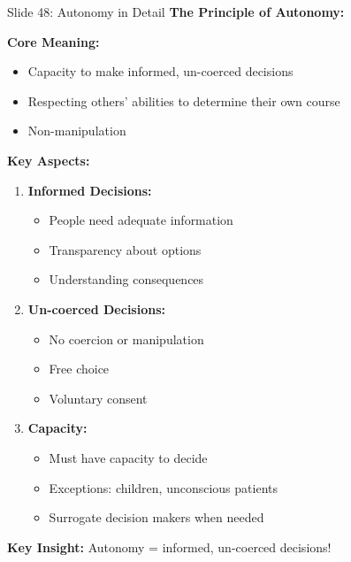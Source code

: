 \documentclass[8pt]{beamer}
\begin{document}
	\begin{frame}{Slide 48: Autonomy in Detail}
		\fontsize{6.5}{7.5}\selectfont
		\textbf{The Principle of Autonomy:}
		
		\vspace{0.1cm}
		\textbf{Core Meaning:}
		\begin{itemize}
			\item Capacity to make informed, un-coerced decisions
			\item Respecting others' abilities to determine their own course
			\item Non-manipulation
		\end{itemize}
		
		\vspace{0.1cm}
		\textbf{Key Aspects:}
		\begin{enumerate}
			\item \textbf{Informed Decisions:}
			\begin{itemize}
				\item People need adequate information
				\item Transparency about options
				\item Understanding consequences
			\end{itemize}
			\item \textbf{Un-coerced Decisions:}
			\begin{itemize}
				\item No coercion or manipulation
				\item Free choice
				\item Voluntary consent
			\end{itemize}
			\item \textbf{Capacity:}
			\begin{itemize}
				\item Must have capacity to decide
				\item Exceptions: children, unconscious patients
				\item Surrogate decision makers when needed
			\end{itemize}
		\end{enumerate}
		
		\textcolor{myblue}{\textbf{Key Insight:}} Autonomy = \textcolor{myblue}{informed, un-coerced decisions}!
	\end{frame}
	
\end{document}
